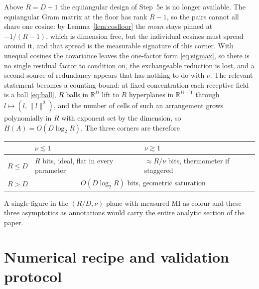 \documentclass[11pt,a4paper]{article}
\newcommand{\RR}{\mathbb{R}}
\begin{document}
Above $R=D+1$ the equiangular design of Step~5e is no longer available. The equiangular Gram
matrix at the floor has rank $R-1$, so the pairs cannot all share one cosine: by
Lemma~\ref{lem:cosfloor} the \emph{mean} stays pinned at $-1/(R-1)$, which is dimension
free, but the individual cosines must spread around it, and that spread is the measurable
signature of this corner. With unequal cosines the covariance leaves the one-factor form
\eqref{eq:sigmax}, so there is no single residual factor to condition on, the exchangeable
reduction is lost, and a second source of redundancy appears that has nothing to do with
$\nu$. The relevant statement becomes a counting bound: at
fixed concentration each receptive field is a ball \eqref{eq:ball}, $R$ balls in $\RR^D$
lift to $R$ hyperplanes in $\RR^{D+1}$ through $l\mapsto(l,\|l\|^2)$, and the number of
cells of such an arrangement grows polynomially in $R$ with exponent set by the
dimension, so $H(A)=O(D\log_2 R)$. The three corners are therefore
\begin{center}
\begin{tabular}{lll}
\toprule
 & $\nu\lesssim1$ & $\nu\gtrsim1$ \\
\midrule
$R\le D$ & $R$ bits, ideal, flat in every parameter & $\approx R/\nu$ bits, thermometer if staggered \\
$R>D$ & \multicolumn{2}{c}{$O(D\log_2 R)$ bits, geometric saturation} \\
\bottomrule
\end{tabular}
\end{center}
A single figure in the $(R/D,\nu)$ plane with measured MI as colour and these three
asymptotics as annotations would carry the entire analytic section of the paper.

\section{Numerical recipe and validation protocol}
\label{sec:numerics}
\end{document}
